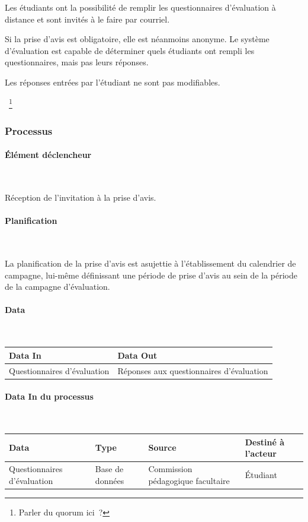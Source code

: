 \documentclass[a4paper,11pt]{report}
\begin{document}
Les étudiants ont la possibilité de remplir les questionnaires d'évaluation à distance et sont invités à le faire par courriel.

Si la prise d'avis est obligatoire, elle est néanmoins anonyme. Le système d'évaluation est capable de déterminer quels étudiants ont rempli les questionnaires, mais pas leurs réponses.

Les réponses entrées par l'étudiant ne sont pas modifiables.

~\footnote{Parler du quorum ici~?}

\subsubsection{Processus}
\paragraph{Élément déclencheur}~\newline{}

Réception de l'invitation à la prise d'avis.

\paragraph{Planification}~\newline{}

La planification de la prise d'avis est asujettie à l'établissement du calendrier de campagne, lui-même définissant une période de prise d'avis au sein de la période de la campagne d'évaluation.

\paragraph{Data}~\newline{}

\begin{tabularx}{\linewidth}{|X|X|} \hline
Data In & Data Out \\ \hline
Questionnaires d'évaluation & Réponses aux questionnaires d'évaluation\\ \hline
\end{tabularx}

\paragraph{Data In du processus}~\newline{}

\begin{tabularx}{\linewidth}{|X|X|X|X|} \hline
Data & Type & Source & Destiné à l'acteur \\ \hline
Questionnaires d'évaluation & Base de données & Commission pédagogique facultaire & Étudiant \\ \hline
\end{tabularx}
\end{document}
